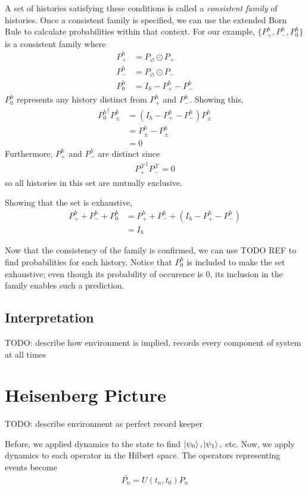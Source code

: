 A set of histories satisfying these conditions is called a \textit{consistent family} of histories. Once a consistent family is specified, we can use the extended Born Rule to calculate probabilities within that context. For our example, $\{P^h_+, P^h_-, P^h_0\}$ is a consistent family where
\begin{align}
    P^h_+ &= P_\varnothing \odot P_+ \\ \nonumber
    P^h_- &= P_\varnothing \odot P_- \\ \nonumber
    P^h_0 &= I_h - P^h_+ - P^h_-
\end{align}
$P^h_0$ represents any history distinct from $P^h_+$ and $P^h_-$. Showing this,
\begin{align}
  {P^h_0}^\dagger P^h_\pm &= (I_h - P^h_+ - P^h_-) P^h_\pm \\ \nonumber
  &= P^h_\pm - P^h_\pm \\ \nonumber
  &= 0
\end{align}
Furthermore, $P^h_+$ and $P^h_-$ are distinct since
\begin{align}
  {P^\mathcal{X}_+}^\dagger P^\mathcal{X}_- = 0
\end{align}
so all histories in this set are mutually exclusive.

Showing that the set is exhaustive,
\begin{align}
  P^h_+ + P^h_- + P^h_0 &=  P^h_+ + P^h_- + \left(I_h - P^h_+ - P^h_- \right) \\ \nonumber
  &= I_h
\end{align}

Now that the consistency of the family is confirmed, we can use TODO REF to find probabilities for each history. Notice that $P^h_0$ is included to make the set exhaustive; even though its probability of occurence is $0$, its inclusion in the family enables such a prediction.

\subsection{Interpretation}

TODO: describe how environment is implied, records every component of system at all times

\section{Heisenberg Picture}
TODO: describe environment as perfect record keeper

Before, we applied dynamics to the state to find $\ket{\psi_0}, \ket{\psi_1},$ etc. Now, we apply dynamics to each operator in the Hilbert space. The operators representing events become
\begin{align}
  \bar{P_n} = U(t_n, t_0)P_n
\end{align}

